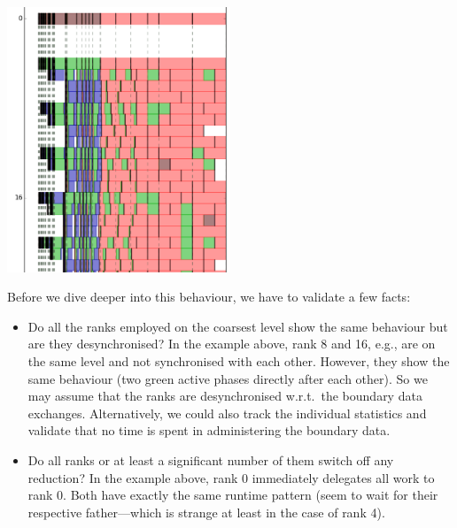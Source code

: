 \begin{center}
  \includegraphics[width=0.5\textwidth]{63_mpi-synchronisation/mpi-phases-late-master.png}
\end{center}


Before we dive deeper into this behaviour, we have to validate a few facts:
\begin{itemize}
  \item Do all the ranks employed on the coarsest level show the same behaviour
  but are they desynchronised? In the example above, rank 8 and 16, e.g., are on
  the same level and not synchronised with each other. However, they show the
  same behaviour (two green active phases directly after each other). So we may
  assume that the ranks are desynchronised w.r.t.~the boundary data exchanges.
  Alternatively, we could also track the individual statistics and validate that
  no time is spent in administering the boundary data.
  \item Do all ranks or at least a significant number of them switch off any
  reduction? In the example above, rank 0 immediately delegates all work to rank
  0. Both have exactly the same runtime pattern (seem to wait for their
  respective father---which is strange at least in the case of rank 4).
\end{itemize}

